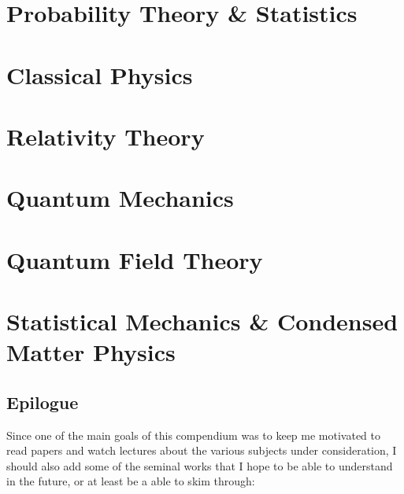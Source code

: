 \documentclass[11pt, a4paper]{report}
\begin{document}
\part{Probability Theory \& Statistics}






\part{Classical Physics}







\part{Relativity Theory}


\part{Quantum Mechanics}








\part{Quantum Field Theory}



%





\part{Statistical Mechanics \& Condensed Matter Physics}





\chapter{Epilogue}

    Since one of the main goals of this compendium was to keep me motivated to read papers and watch lectures about the various subjects under consideration, I should also add some of the seminal works that I hope to be able to understand  in the future, or at least be a able to skim through:
\end{document}
